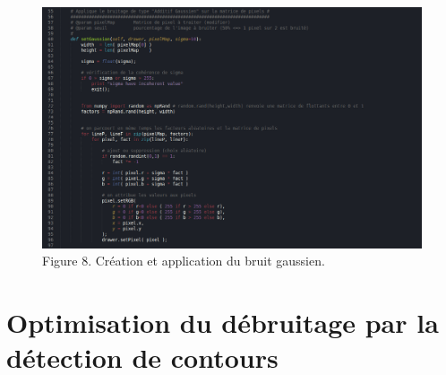 \documentclass{article}
\begin{document}
	
	\begin{figure}
		\begin{center}
			\includegraphics[scale=.4]{st3/Gaussian_SET.jpg}\\
			Figure 8. Création et application du bruit gaussien.
		\end{center}
	\end{figure}

	\newpage


	\part*{Optimisation du débruitage par la détection de contours}
	
\end{document}
